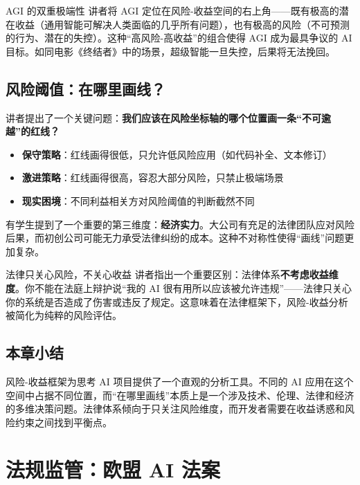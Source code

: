 \documentclass[a4paper]{article}
\begin{document}
\begin{warningbox}{AGI 的双重极端性}
讲者将 AGI 定位在风险-收益空间的右上角——既有极高的潜在收益（通用智能可解决人类面临的几乎所有问题），也有极高的风险（不可预测的行为、潜在的失控）。这种``高风险-高收益''的组合使得 AGI 成为最具争议的 AI 目标。如同电影《终结者》中的场景，超级智能一旦失控，后果将无法挽回。
\end{warningbox}

\subsection{风险阈值：在哪里画线？}

讲者提出了一个关键问题：\textbf{我们应该在风险坐标轴的哪个位置画一条``不可逾越''的红线？}

\begin{itemize}
    \item \textbf{保守策略}：红线画得很低，只允许低风险应用（如代码补全、文本修订）
    \item \textbf{激进策略}：红线画得很高，容忍大部分风险，只禁止极端场景
    \item \textbf{现实困境}：不同利益相关方对风险阈值的判断截然不同
\end{itemize}

有学生提到了一个重要的第三维度：\textbf{经济实力}。大公司有充足的法律团队应对风险后果，而初创公司可能无力承受法律纠纷的成本。这种不对称性使得``画线''问题更加复杂。

\begin{knowledgebox}{法律只关心风险，不关心收益}
讲者指出一个重要区别：法律体系\textbf{不考虑收益维度}。你不能在法庭上辩护说``我的 AI 很有用所以应该被允许违规''——法律只关心你的系统是否造成了伤害或违反了规定。这意味着在法律框架下，风险-收益分析被简化为纯粹的风险评估。
\end{knowledgebox}

\subsection{本章小结}

风险-收益框架为思考 AI 项目提供了一个直观的分析工具。不同的 AI 应用在这个空间中占据不同位置，而``在哪里画线''本质上是一个涉及技术、伦理、法律和经济的多维决策问题。法律体系倾向于只关注风险维度，而开发者需要在收益诱惑和风险约束之间找到平衡点。

\section{法规监管：欧盟 AI 法案}
\end{document}
